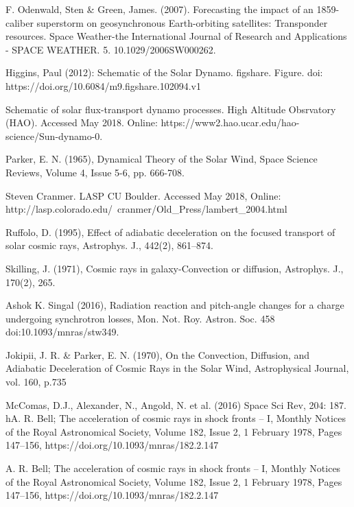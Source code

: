 \documentclass[%
 reprint,
 amsmath,amssymb,
 aps,
]{revtex4-1}
\begin{document}
\begin{thebibliography}{22}

 F. Odenwald, Sten \& Green, James. (2007). Forecasting the impact of an 1859-caliber superstorm on geosynchronous Earth-orbiting satellites: Transponder resources. Space Weather-the International Journal of Research and Applications - SPACE WEATHER. 5. 10.1029/2006SW000262. 

 Higgins, Paul (2012): Schematic of the Solar Dynamo. figshare. Figure. doi: https://doi.org/10.6084/m9.figshare.102094.v1

 Schematic of solar flux-transport dynamo processes. High Altitude Obsrvatory (HAO). Accessed May 2018. Online: https://www2.hao.ucar.edu/hao-science/Sun-dynamo-0.

 Parker, E. N. (1965), Dynamical Theory of the Solar Wind, Space Science Reviews, Volume 4, Issue 5-6, pp. 666-708.

 Steven Cranmer. LASP CU Boulder. Accessed May 2018, Online: http://lasp.colorado.edu/~cranmer/Old\_Press/lambert\_2004.html

 Ruffolo, D. (1995), Effect of adiabatic deceleration on the focused transport of solar cosmic rays, Astrophys. J., 442(2), 861–874.

 Skilling, J. (1971), Cosmic rays in galaxy-Convection or diffusion, Astrophys. J., 170(2), 265.

  Ashok K. Singal (2016), Radiation reaction and pitch-angle changes for a charge undergoing synchrotron losses, Mon. Not. Roy. Astron. Soc. 458 doi:10.1093/mnras/stw349.

 Jokipii, J. R. \& Parker, E. N. (1970), On the Convection, Diffusion, and Adiabatic Deceleration of Cosmic Rays in the Solar Wind, Astrophysical Journal, vol. 160, p.735

 McComas, D.J., Alexander, N., Angold, N. et al. (2016) Space Sci Rev, 204: 187. hA. R. Bell; The acceleration of cosmic rays in shock fronts – I, Monthly Notices of the Royal Astronomical Society, Volume 182, Issue 2, 1 February 1978, Pages 147–156, https://doi.org/10.1093/mnras/182.2.147

 A. R. Bell; The acceleration of cosmic rays in shock fronts – I, Monthly Notices of the Royal Astronomical Society, Volume 182, Issue 2, 1 February 1978, Pages 147–156, https://doi.org/10.1093/mnras/182.2.147


\end{thebibliography}
\end{document}
